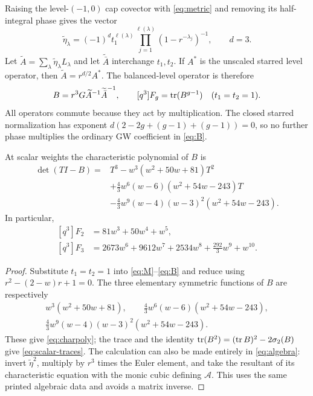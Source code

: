 Raising the level-$(-1,0)$ cap covector with \eqref{eq:metric}
and removing its half-integral phase gives the vector
\begin{equation}\label{eq:cap}
 \widetilde\eta_\lambda
 =(-1)^d t_1^{\ell(\lambda)}
   \prod_{j=1}^{\ell(\lambda)}(1-r^{-\lambda_j})^{-1},
 \qquad d=3.
\end{equation}
Let $\widetilde A=\sum_\lambda\widetilde\eta_\lambda L_\lambda$
and let $\widetilde{\bar A}$ interchange $t_1,t_2$. If $A^*$ is
the unscaled starred level operator, then
$\widetilde A=r^{d/2}A^*$. The balanced-level operator is therefore
\begin{equation}\label{eq:B}
 B=r^3G\widetilde A^{-1}\widetilde{\bar A}^{-1},\qquad
 [q^3]F_g=\operatorname{tr}(B^{g-1})\quad(t_1=t_2=1).
\end{equation}
All operators commute because they act by multiplication.
The closed starred normalization has exponent
$d(2-2g+(g-1)+(g-1))=0$, so no further phase multiplies the
ordinary GW coefficient in \eqref{eq:B}.

\begin{proposition}\label{prop:trace}
At scalar weights the characteristic polynomial of $B$ is
\begin{equation}\label{eq:charpoly}
 \begin{split}
 \det(TI-B)={}&T^3-w^3(w^2+50w+81)T^2\\
 &+\frac43w^6(w-6)(w^2+54w-243)T\\
 &-\frac43w^9(w-4)(w-3)^2(w^2+54w-243).
 \end{split}
\end{equation}
In particular,
\begin{equation}\label{eq:scalar-traces}
 \begin{split}
 [q^3]F_2&=81w^3+50w^4+w^5,\\
 [q^3]F_3&=2673w^6+9612w^7+2534w^8+\frac{292}{3}w^9+w^{10}.
 \end{split}
\end{equation}
\end{proposition}
\begin{proof}
Substitute $t_1=t_2=1$ into \eqref{eq:M}--\eqref{eq:B} and reduce
using $r^2-(2-w)r+1=0$. The three elementary symmetric functions
of $B$ are respectively
\[
 \begin{gathered}
 w^3(w^2+50w+81),\qquad
 \frac43w^6(w-6)(w^2+54w-243),\\
 \frac43w^9(w-4)(w-3)^2(w^2+54w-243).
 \end{gathered}
\]
These give \eqref{eq:charpoly}; the trace and the identity
$\operatorname{tr}(B^2)=(\operatorname{tr} B)^2-2\sigma_2(B)$ give \eqref{eq:scalar-traces}.
The calculation can also be made entirely in \eqref{eq:algebra}:
invert $\widetilde\eta^2$, multiply by $r^3$ times the Euler
element, and take the resultant of its characteristic equation with
the monic cubic defining $\mathcal A$. This uses the same printed
algebraic data and avoids a matrix inverse.
\end{proof}

